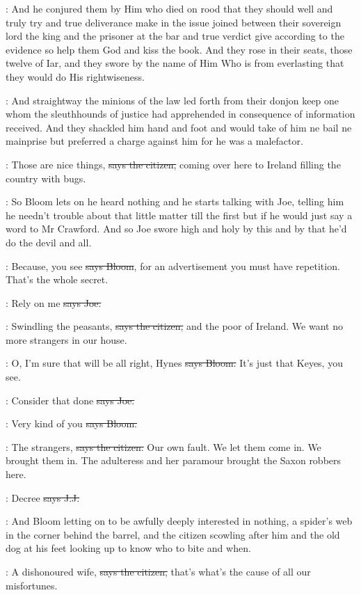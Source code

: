 :
And he conjured them by Him who died on rood that
they should well and truly try and true deliverance make in the
issue joined between their sovereign lord the king and the prisoner at
the bar and true verdict give according to the evidence so help them God
and kiss the book.
And they rose in their seats,
those twelve of Iar,
and
they swore by the name of Him Who is from everlasting that they would do
His rightwiseness.

:
And straightway the minions of the law led forth from
their donjon keep one whom the sleuthhounds of justice had apprehended in
consequence of information received.
And they shackled him hand and foot
and would take of him ne bail ne mainprise but preferred a charge against
him
for he was a malefactor.

\citizen:
Those are nice things,
\sout{says the citizen,}
coming over here to Ireland filling the country with bugs.

\Nq:
So Bloom lets on he heard nothing and he starts talking with Joe,
telling
him he needn't trouble about that little matter till the first but if he
would just say a word to Mr Crawford.
And so Joe swore high and holy by
this and by that he'd do the devil and all.

\Bloom:
Because,
you see
\sout{says Bloom},
for an advertisement you must have
repetition.
That's the whole secret.

\joe:
Rely on me
\sout{says Joe.}

\citizen:
Swindling the peasants,
\sout{says the citizen,}
and the poor of Ireland.
We
want no more strangers in our house.

\Bloom:
O,
I'm sure that will be all right,
Hynes
\sout{says Bloom.}
It's just that
Keyes,
you see.

\joe:
Consider that done
\sout{says Joe.}

\Bloom:
Very kind of you
\sout{says Bloom.}

\citizen:
The strangers,
\sout{says the citizen.}
Our own fault.
We let them come in.
We
brought them in.
The adulteress and her paramour brought the Saxon
robbers here.

\jjom:
Decree 
\sout{says J.J.}

\Nq:
And Bloom letting on to be awfully deeply interested in nothing,
a
spider's web in the corner behind the barrel,
and the citizen scowling
after him and the old dog at his feet looking up to know who to bite and
when.

\citizen:
A dishonoured wife,
\sout{says the citizen,}
that's what's the cause of all our
misfortunes.

